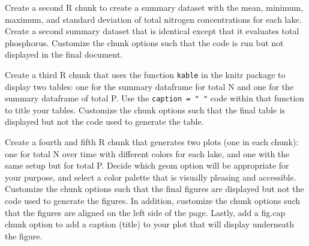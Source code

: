 \documentclass[]{article}
\newenvironment{Shaded}{\begin{snugshade}}{\end{snugshade}}
\newcommand{\DataTypeTok}[1]{\textcolor[rgb]{0.13,0.29,0.53}{#1}}
\newcommand{\KeywordTok}[1]{\textcolor[rgb]{0.13,0.29,0.53}{\textbf{#1}}}
\newcommand{\NormalTok}[1]{#1}
\newcommand{\OperatorTok}[1]{\textcolor[rgb]{0.81,0.36,0.00}{\textbf{#1}}}
\newcommand{\StringTok}[1]{\textcolor[rgb]{0.31,0.60,0.02}{#1}}
\begin{document}
Create a second R chunk to create a summary dataset with the mean,
minimum, maximum, and standard deviation of total nitrogen
concentrations for each lake. Create a second summary dataset that is
identical except that it evaluates total phosphorus. Customize the chunk
options such that the code is run but not displayed in the final
document.

\begin{Shaded}
\end{Shaded}

Create a third R chunk that uses the function \texttt{kable} in the
knitr package to display two tables: one for the summary dataframe for
total N and one for the summary dataframe of total P. Use the
\texttt{caption\ =\ "\ "} code within that function to title your
tables. Customize the chunk options such that the final table is
displayed but not the code used to generate the table.

Create a fourth and fifth R chunk that generates two plots (one in each
chunk): one for total N over time with different colors for each lake,
and one with the same setup but for total P. Decide which geom option
will be appropriate for your purpose, and select a color palette that is
visually pleasing and accessible. Customize the chunk options such that
the final figures are displayed but not the code used to generate the
figures. In addition, customize the chunk options such that the figures
are aligned on the left side of the page. Lastly, add a fig.cap chunk
option to add a caption (title) to your plot that will display
underneath the figure.
\end{document}
